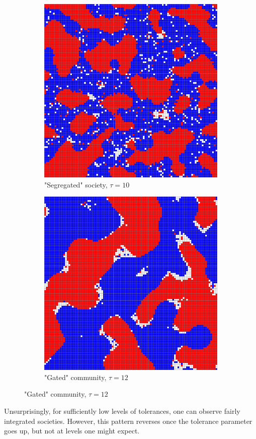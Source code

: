 \documentclass[../main.tex]{subfiles}
\begin{document}
\begin{figure}[H]
\begin{subfigure}{0.45\textwidth}
	\end{subfigure}	
	\begin{subfigure}{0.45\textwidth}	
	\centering
     \caption{"Segregated" society, $\tau = 10$}
	\includegraphics[width=\textwidth]{figs/schelling_10.pdf}	
	\end{subfigure}
    \begin{subfigure}{0.45\textwidth}	
	\centering
     \caption{"Gated" community, $\tau = 12$}
	\includegraphics[width=\textwidth]{figs/schelling_12.pdf}	
	\end{subfigure}
\end{figure}

Unsurprisingly, for sufficiently low levels of tolerances, one can observe fairly integrated societies. However, this pattern reverses once the tolerance parameter goes up, but not at levels one might expect. 
\end{document}

